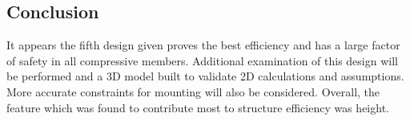 	

	






\subsection{Conclusion}

It appears the fifth design given proves the best efficiency and has a large factor of safety in all compressive members.
Additional examination of this design will be performed and a 3D model built to validate 2D calculations and assumptions.
More accurate constraints for mounting will also be considered.
Overall, the feature which was found to contribute most to structure efficiency was height.